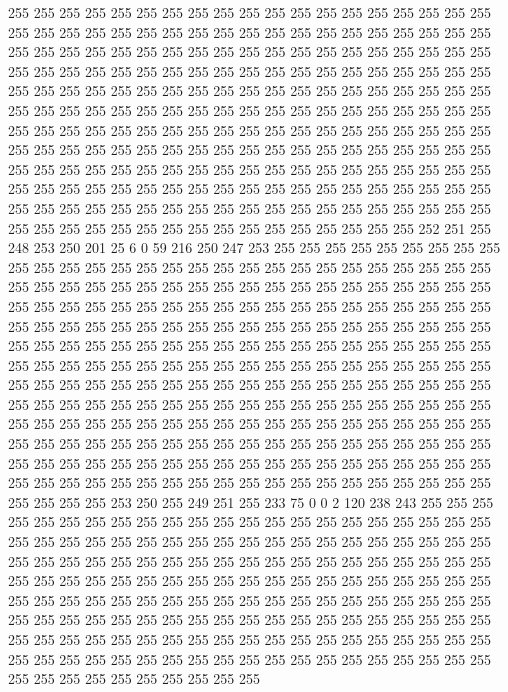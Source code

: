 255 255 255 255 255 255 255 255 255 255 255 255 255 255 255 255 255 255 255 255
255 255 255 255 255 255 255 255 255 255 255 255 255 255 255 255 255 255 255 255
255 255 255 255 255 255 255 255 255 255 255 255 255 255 255 255 255 255 255 255
255 255 255 255 255 255 255 255 255 255 255 255 255 255 255 255 255 255 255 255
255 255 255 255 255 255 255 255 255 255 255 255 255 255 255 255 255 255 255 255
255 255 255 255 255 255 255 255 255 255 255 255 255 255 255 255 255 255 255 255
255 255 255 255 255 255 255 255 255 255 255 255 255 255 255 255 255 255 255 255
255 255 255 255 255 255 255 255 255 255 255 255 255 255 255 255 255 255 255 255
255 255 255 255 255 255 255 255 255 255 255 255 255 255 255 255 255 255 255 255
255 255 255 255 255 255 255 255 255 255 255 255 255 255 255 255 255 255 255 255
255 255 255 255 255 255 255 255 255 255 255 255 255 255 255 255 255 255 255 255
255 255 255 255 255 252 251 255 248 253 250 201 25 6 0 59 216 250 247 253
255 255 255 255 255 255 255 255 255 255 255 255 255 255 255 255 255 255 255 255
255 255 255 255 255 255 255 255 255 255 255 255 255 255 255 255 255 255 255 255
255 255 255 255 255 255 255 255 255 255 255 255 255 255 255 255 255 255 255 255
255 255 255 255 255 255 255 255 255 255 255 255 255 255 255 255 255 255 255 255
255 255 255 255 255 255 255 255 255 255 255 255 255 255 255 255 255 255 255 255
255 255 255 255 255 255 255 255 255 255 255 255 255 255 255 255 255 255 255 255
255 255 255 255 255 255 255 255 255 255 255 255 255 255 255 255 255 255 255 255
255 255 255 255 255 255 255 255 255 255 255 255 255 255 255 255 255 255 255 255
255 255 255 255 255 255 255 255 255 255 255 255 255 255 255 255 255 255 255 255
255 255 255 255 255 255 255 255 255 255 255 255 255 255 255 255 255 255 255 255
255 255 255 255 255 255 255 255 255 255 255 255 255 255 255 255 255 255 255 255
255 255 255 255 255 255 255 255 255 255 255 255 255 255 255 255 255 255 255 255
255 253 250 255 249 251 255 233 75 0 0 2 120 238 243 255 255 255 255 255
255 255 255 255 255 255 255 255 255 255 255 255 255 255 255 255 255 255 255 255
255 255 255 255 255 255 255 255 255 255 255 255 255 255 255 255 255 255 255 255
255 255 255 255 255 255 255 255 255 255 255 255 255 255 255 255 255 255 255 255
255 255 255 255 255 255 255 255 255 255 255 255 255 255 255 255 255 255 255 255
255 255 255 255 255 255 255 255 255 255 255 255 255 255 255 255 255 255 255 255
255 255 255 255 255 255 255 255 255 255 255 255 255 255 255 255 255 255 255 255
255 255 255 255 255 255 255 255 255 255 255 255 255 255 255 255 255 255 255 255
255 255 255 255 255 255 255 255 255 255 255 255 255 255 255 255 255 255 255 255
